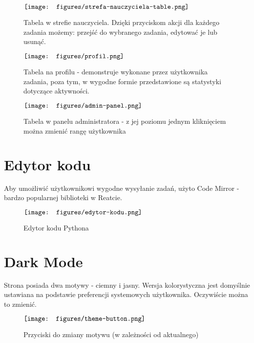 \documentclass[shortabstract,inz]{iithesis}
\begin{document}
\begin{figure}[H]
	\centering
	$\vcenter{\hbox{\texttt{[image: figures/strefa-nauczyciela-table.png]}}}$
    \caption[]{Tabela w strefie nauczyciela. Dzięki przyciskom akcji dla każdego zadania możemy: przejść do wybranego zadania, edytować je lub usunąć.}
    \label{fig:strefa-nauczyciela}
\end{figure}

\begin{figure}[H]
	\centering
	$\vcenter{\hbox{\texttt{[image: figures/profil.png]}}}$
    \caption[]{Tabela na profilu - demonstruje wykonane przez użytkownika zadania, poza tym, w wygodne formie przedstawione są statystyki dotyczące aktywności.}
    \label{fig:profil-użytkownika}
\end{figure}

\begin{figure}[H]
	\centering
	$\vcenter{\hbox{\texttt{[image: figures/admin-panel.png]}}}$
    \caption[]{Tabela w panelu administratora - z jej poziomu jednym kliknięciem można zmienić rangę użytkownika}
    \label{fig:admin-panel}
\end{figure}

\section{Edytor kodu}

Aby umożliwić użytkownikowi wygodne wysyłanie zadań, użyto Code Mirror - bardzo popularnej biblioteki w Reatcie.
\begin{figure}[H]
	\centering
	$\vcenter{\hbox{\texttt{[image: figures/edytor-kodu.png]}}}$
    \caption[]{Edytor kodu Pythona}
    \label{fig:edytor-kodu}
\end{figure}

\section{Dark Mode}
Strona posiada dwa motywy - ciemny i jasny. Wersja kolorystyczna jest domyślnie ustawiana na podstawie preferencji systemowych użytkownika. Oczywiście można to zmienić.

\begin{figure}[H]
	\centering
	$\vcenter{\hbox{\texttt{[image: figures/theme-button.png]}}}$
    \caption[]{Przyciski do zmiany motywu (w zależności od aktualnego)}
    \label{fig:przyciski-motyw}
\end{figure}
\end{document}
